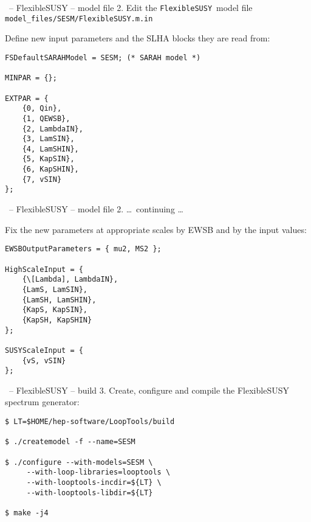 \documentclass[11pt]{beamer}
\newcommand{\FlexibleSUSY}{\texttt{FlexibleSUSY}}
\begin{document}
\begin{frame}[fragile]{\insertsection\ -- FlexibleSUSY -- model file}
  2. Edit the \FlexibleSUSY\ model file
  \texttt{model\_files/SESM/FlexibleSUSY.m.in}

  \bigskip

  Define new input parameters and the SLHA blocks they are read from:
  \begin{lstlisting}
FSDefaultSARAHModel = SESM; (* SARAH model *)

MINPAR = {};

EXTPAR = {
    {0, Qin},
    {1, QEWSB},
    {2, LambdaIN},
    {3, LamSIN},
    {4, LamSHIN},
    {5, KapSIN},
    {6, KapSHIN},
    {7, vSIN}
};\end{lstlisting}%
\end{frame}


\begin{frame}[fragile]{\insertsection\ -- FlexibleSUSY -- model file}
  2. \ldots\ continuing \ldots

  \bigskip

  Fix the new parameters at appropriate scales by EWSB and by the
  input values:
  \begin{lstlisting}
EWSBOutputParameters = { mu2, MS2 };

HighScaleInput = {
    {\[Lambda], LambdaIN},
    {LamS, LamSIN},
    {LamSH, LamSHIN},
    {KapS, KapSIN},
    {KapSH, KapSHIN}
};

SUSYScaleInput = {
    {vS, vSIN}
};\end{lstlisting}%
\end{frame}


\begin{frame}[fragile]{\insertsection\ -- FlexibleSUSY -- build}
  3. Create, configure and compile the FlexibleSUSY spectrum
  generator:
  \begin{lstlisting}
$ LT=$HOME/hep-software/LoopTools/build

$ ./createmodel -f --name=SESM

$ ./configure --with-models=SESM \
     --with-loop-libraries=looptools \
     --with-looptools-incdir=${LT} \
     --with-looptools-libdir=${LT}

$ make -j4\end{lstlisting}%
\end{frame}
\end{document}
